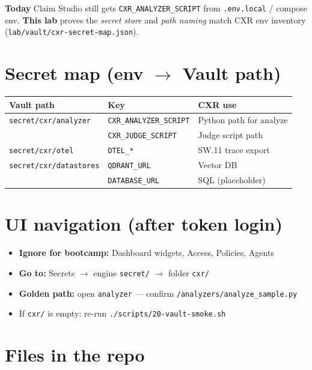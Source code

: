 \documentclass[11pt,a4paper]{report}
\begin{document}
\textbf{Today} Claim Studio still gets \texttt{CXR\_ANALYZER\_SCRIPT} from \texttt{.env.local} / compose env.
\textbf{This lab} proves the \emph{secret store} and \emph{path naming} match CXR env inventory (\texttt{lab/vault/cxr-secret-map.json}).

\chapter{Secret map (env $\rightarrow$ Vault path)}

\begin{center}
\begin{tabular}{lll}
\toprule
Vault path & Key & CXR use \\
\midrule
\texttt{secret/cxr/analyzer} & \texttt{CXR\_ANALYZER\_SCRIPT} & Python path for analyze \\
 & \texttt{CXR\_JUDGE\_SCRIPT} & Judge script path \\
\texttt{secret/cxr/otel} & \texttt{OTEL\_*} & SW.11 trace export \\
\texttt{secret/cxr/datastores} & \texttt{QDRANT\_URL} & Vector DB \\
 & \texttt{DATABASE\_URL} & SQL (placeholder) \\
\bottomrule
\end{tabular}
\end{center}

\chapter{UI navigation (after token login)}

\begin{itemize}
  \item \textbf{Ignore for bootcamp:} Dashboard widgets, Access, Policies, Agents
  \item \textbf{Go to:} Secrets $\rightarrow$ engine \texttt{secret/} $\rightarrow$ folder \texttt{cxr/}
  \item \textbf{Golden path:} open \texttt{analyzer} --- confirm \texttt{/analyzers/analyze\_sample.py}
  \item If \texttt{cxr/} is empty: re-run \texttt{./scripts/20-vault-smoke.sh}
\end{itemize}

\chapter{Files in the repo}
\end{document}
